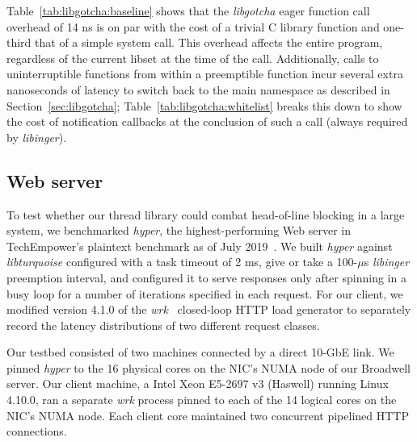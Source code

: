 Table~\ref{tab:libgotcha:baseline} shows that the \textit{libgotcha} eager function
call overhead of 14 ns is on par with the cost of a trivial C library function and
one-third
that of a simple system call.  This overhead affects the entire program, regardless
of the
current libset at the time of the call.  Additionally, calls to
uninterruptible functions from within a preemptible function incur several extra
nanoseconds of latency to switch back to the main namespace as described in
Section~\ref{sec:libgotcha}; Table~\ref{tab:libgotcha:whitelist} breaks this down to
show the cost of notification callbacks at the conclusion of such a call (always
required by \textit{libinger}).


\subsection{Web server}

To test whether our thread library could combat head-of-line blocking in a large
system, we benchmarked
\textit{hyper}, the highest-performing Web server in TechEmpower's plaintext
benchmark as of July 2019~\cite{www-hyper}.  We built \textit{hyper} against
\textit{libturquoise} configured with a task timeout of 2 ms, give or take a
100-$\mu$s \textit{libinger} preemption interval, and configured it to serve
responses only after spinning in a busy loop for a number of iterations specified in
each request.  For our client, we modified version 4.1.0 of the
\textit{wrk}~\cite{www-wrk} closed-loop HTTP load generator to separately record the
latency distributions of two different request classes.

Our testbed consisted of two machines connected by a direct 10-GbE link.  We pinned
\textit{hyper} to the 16 physical cores on the NIC's NUMA node of our Broadwell
server.  Our client machine, a Intel Xeon E5-2697 v3 (Haswell) running Linux 4.10.0,
ran a separate \textit{wrk} process pinned to each of the 14 logical cores on the
NIC's NUMA node.  Each client core maintained two concurrent pipelined HTTP
connections.


